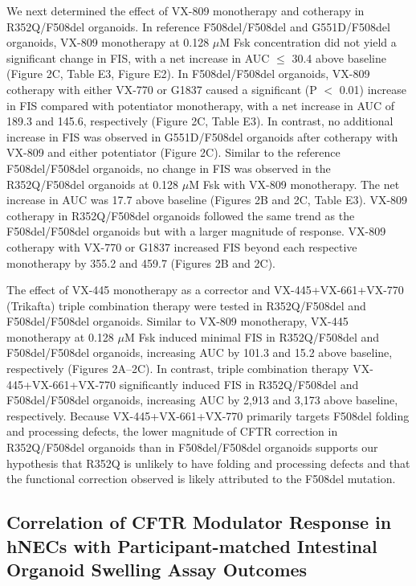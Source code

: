 We next determined the effect of VX-809 monotherapy and cotherapy in R352Q/F508del organoids. In reference F508del/F508del and G551D/F508del organoids, VX-809 monotherapy at 0.128 $\mu$M Fsk concentration did not yield a significant change in FIS, with a net increase in AUC $\leq$ 30.4 above baseline (Figure 2C, Table E3, Figure E2). In F508del/F508del organoids, VX-809 cotherapy with either VX-770 or G1837 caused a significant (P $<$ 0.01) increase in FIS compared with potentiator monotherapy, with a net increase in AUC of 189.3 and 145.6, respectively (Figure 2C, Table E3). In contrast, no additional increase in FIS was observed in G551D/F508del organoids after cotherapy with VX-809 and either potentiator (Figure 2C). Similar to the reference F508del/F508del organoids, no change in FIS was observed in the R352Q/F508del organoids at 0.128 $\mu$M Fsk with VX-809 monotherapy. The net increase in AUC was 17.7 above baseline (Figures 2B and 2C, Table E3). VX-809 cotherapy in R352Q/F508del organoids followed the same trend as the F508del/F508del organoids but with a larger magnitude of response. VX-809 cotherapy with VX-770 or G1837 increased FIS beyond each respective monotherapy by 355.2 and 459.7 (Figures 2B and 2C).

The effect of VX-445 monotherapy as a corrector and VX-445+VX-661+VX-770 (Trikafta) triple combination therapy were tested in R352Q/F508del and F508del/F508del organoids. Similar to VX-809 monotherapy, VX-445 monotherapy at 0.128 $\mu$M Fsk induced minimal FIS in R352Q/F508del and F508del/F508del organoids, increasing AUC by 101.3 and 15.2 above baseline, respectively (Figures 2A–2C). In contrast, triple combination therapy VX-445+VX-661+VX-770 significantly induced FIS in R352Q/F508del and F508del/F508del organoids, increasing AUC by 2,913 and 3,173 above baseline, respectively. Because VX-445+VX-661+VX-770 primarily targets F508del folding and processing defects, the lower magnitude of CFTR correction in R352Q/F508del organoids than in F508del/F508del organoids supports our hypothesis that R352Q is unlikely to have folding and processing defects and that the functional correction observed is likely attributed to the F508del mutation.

\subsection{Correlation of CFTR Modulator Response in hNECs with Participant-matched Intestinal Organoid Swelling Assay Outcomes}

